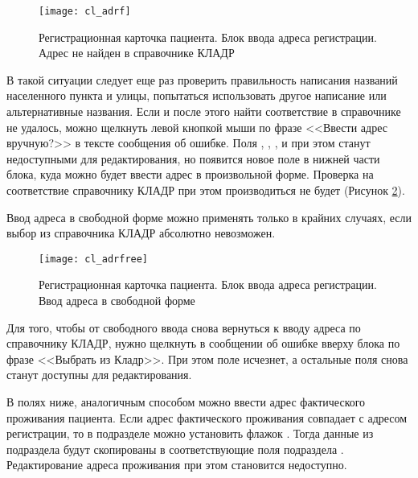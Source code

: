 {\begin{figure}[ht]\centering
 \texttt{[image: cl\_adrf]}
 \caption{Регистрационная карточка пациента. Блок ввода адреса регистрации. Адрес не найден в справочнике КЛАДР}
 \label{img_cl_adrf}
\end{figure} 

В такой ситуации следует еще раз проверить правильность написания названий населенного пункта и улицы, попытаться использовать другое написание или альтернативные названия. Если и после этого найти соответствие в справочнике не удалось, можно щелкнуть левой кнопкой мыши по фразе <<Ввести адрес вручную?>> в тексте сообщения об ошибке. Поля  , , ,  и  при этом станут недоступными для редактирования, но появится новое поле  в нижней части блока, куда можно будет ввести адрес в произвольной форме. Проверка на соответствие справочнику КЛАДР при этом производиться не будет (Рисунок \ref{img_cl_adrfree}). 

\begin{vnim}
Ввод адреса в свободной форме можно применять только в крайних случаях, если выбор из справочника КЛАДР абсолютно невозможен. 
\end{vnim}

\begin{figure}[ht]\centering
 \texttt{[image: cl\_adrfree]}
 \caption{Регистрационная карточка пациента. Блок ввода адреса регистрации. Ввод адреса в свободной форме}
 \label{img_cl_adrfree}
\end{figure}   

\begin{prim}
Для того, чтобы от свободного ввода снова вернуться к вводу адреса по справочнику КЛАДР, нужно щелкнуть в сообщении об ошибке вверху блока по фразе <<Выбрать из Кладр>>. При этом поле  исчезнет, а остальные поля снова станут доступны для редактирования.
\end{prim}

В полях ниже, аналогичным способом можно ввести адрес фактического проживания пациента. Если адрес фактического проживания совпадает с адресом регистрации, то в подразделе  можно установить флажок . Тогда данные из подраздела  будут скопированы в соответствующие поля подраздела . Редактирование адреса проживания при этом становится недоступно. 
 
}
